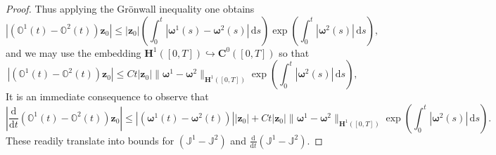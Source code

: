\documentclass[a4paper]{amsart}
\numberwithin{equation}{section}
\theoremstyle{plain}
\newcommand{\mbf}[1]{\mathbf{#1}}
\newcommand{\mbb}[1]{\mathbb{#1}}
\begin{document}
\begin{proof}
Thus applying the Gr\"onwall inequality one obtains
\[ \left| (\mbb{O}^1(t) - \mbb{O}^2(t))\mbf{z}_0 \right| \leq |\mbf{z}_0|\left(\int_0^t |\boldsymbol{\omega}^1(s) - \boldsymbol{\omega}^2(s)| \, \mathrm{d}s \right) \exp\left( \int_0^t |\boldsymbol{\omega}^2(s)| \, \mathrm{d}s\right), \]
and we may use the embedding $\mbf{H}^1([0,T]) \hookrightarrow \mbf{C}^0([0,T])$ so that
\[ \left| (\mbb{O}^1(t) - \mbb{O}^2(t))\mbf{z}_0 \right| \leq Ct|\mbf{z}_0|\|\boldsymbol{\omega}^1 -\boldsymbol{\omega}^2\|_{\mbf{H}^1([0,T])}\exp\left( \int_0^t |\boldsymbol{\omega}^2(s)| \, \mathrm{d}s\right), \]
It is an immediate consequence to observe that
\[ \left| \frac{\mathrm{d}}{\mathrm{d}t} (\mbb{O}^1(t) - \mbb{O}^2(t))\mbf{z}_0  \right| \leq |(\boldsymbol{\omega}^1(t) - \boldsymbol{\omega}^2(t))| |\mbf{z}_0| + Ct|\mbf{z}_0|\|\boldsymbol{\omega}^1 -\boldsymbol{\omega}^2\|_{\mbf{H}^1([0,T])}\exp\left( \int_0^t |\boldsymbol{\omega}^2(s)| \, \mathrm{d}s\right). \]
These readily translate into bounds for $(\mbb{J}^1 - \mbb{J}^2)$ and $\frac{\mathrm{d}}{\mathrm{d}t}(\mbb{J}^1 - \mbb{J}^2)$.


\end{proof}
\end{document}
